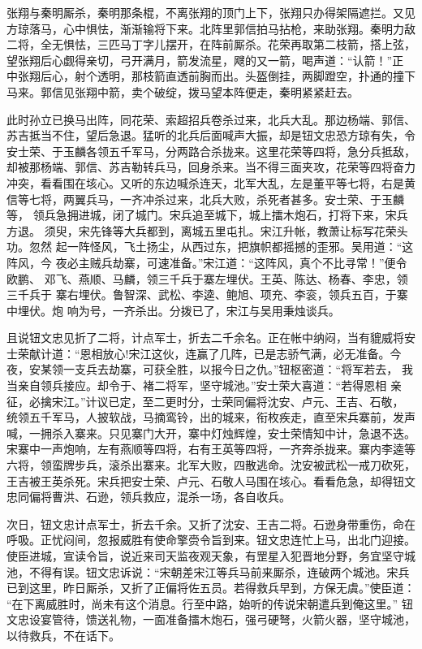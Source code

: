 张翔与秦明厮杀，秦明那条棍，不离张翔的顶门上下，张翔只办得架隔遮拦。又见
方琼落马，心中惧怯，渐渐输将下来。北阵里郭信拍马拈枪，来助张翔。秦明力敌
二将，全无惧怯，三匹马丁字儿摆开，在阵前厮杀。花荣再取第二枝箭，搭上弦，
望张翔后心觑得亲切，弓开满月，箭发流星，飕的又一箭，喝声道：“认箭！”正
中张翔后心，射个透明，那枝箭直透前胸而出。头盔倒挂，两脚蹬空，扑通的撞下
马来。郭信见张翔中箭，卖个破绽，拨马望本阵便走，秦明紧紧赶去。

此时孙立已换马出阵，同花荣、索超招兵卷杀过来，北兵大乱。那边杨端、郭信、
苏吉抵当不住，望后急退。猛听的北兵后面喊声大振，却是钮文忠恐方琼有失，令
安士荣、于玉麟各领五千军马，分两路合杀拢来。这里花荣等四将，急分兵抵敌，
却被那杨端、郭信、苏吉勒转兵马，回身杀来。当不得三面夹攻，花荣等四将奋力
冲突，看看围在垓心。又听的东边喊杀连天，北军大乱，左是董平等七将，右是黄
信等七将，两翼兵马，一齐冲杀过来，北兵大败，杀死者甚多。安士荣、于玉麟等，
领兵急拥进城，闭了城门。宋兵追至城下，城上擂木炮石，打将下来，宋兵方退。
须臾，宋先锋等大兵都到，离城五里屯扎。宋江升帐，教萧让标写花荣头功。忽然
起一阵怪风，飞土扬尘，从西过东，把旗帜都摇撼的歪邪。吴用道：“这阵风，今
夜必主贼兵劫寨，可速准备。”宋江道：“这阵风，真个不比寻常！”便令欧鹏、
邓飞、燕顺、马麟，领三千兵于寨左埋伏。王英、陈达、杨春、李忠，领三千兵于
寨右埋伏。鲁智深、武松、李逵、鲍旭、项充、李衮，领兵五百，于寨中埋伏。炮
响为号，一齐杀出。分拨已了，宋江与吴用秉烛谈兵。

且说钮文忠见折了二将，计点军士，折去二千余名。正在帐中纳闷，当有貔威将安
士荣献计道：“恩相放心!宋江这伙，连赢了几阵，已是志骄气满，必无准备。今
夜，安某领一支兵去劫寨，可获全胜，以报今日之仇。”钮枢密道：“将军若去，
我当亲自领兵接应。却令于、褚二将军，坚守城池。”安士荣大喜道：“若得恩相
亲征，必擒宋江。”计议已定，至二更时分，士荣同偏将沈安、卢元、王吉、石敬，
统领五千军马，人披软战，马摘鸾铃，出的城来，衔枚疾走，直至宋兵寨前，发声
喊，一拥杀入寨来。只见寨门大开，寨中灯烛辉煌，安士荣情知中计，急退不迭。
宋寨中一声炮响，左有燕顺等四将，右有王英等四将，一齐奔杀拢来。寨内李逵等
六将，领蛮牌步兵，滚杀出寨来。北军大败，四散逃命。沈安被武松一戒刀砍死，
王吉被王英杀死。宋兵把安士荣、卢元、石敬人马围在垓心。看看危急，却得钮文
忠同偏将曹洪、石逊，领兵救应，混杀一场，各自收兵。

次日，钮文忠计点军士，折去千余。又折了沈安、王吉二将。石逊身带重伤，命在
呼吸。正忧闷间，忽报威胜有使命擎赍令旨到来。钮文忠连忙上马，出北门迎接。
使臣进城，宣读令旨，说近来司天监夜观天象，有罡星入犯晋地分野，务宜坚守城
池，不得有误。钮文忠诉说：“宋朝差宋江等兵马前来厮杀，连破两个城池。宋兵
已到这里，昨日厮杀，又折了正偏将佐五员。若得救兵早到，方保无虞。”使臣道：
“在下离威胜时，尚未有这个消息。行至中路，始听的传说宋朝遣兵到俺这里。”
钮文忠设宴管待，馈送礼物，一面准备擂木炮石，强弓硬弩，火箭火器，坚守城池，
以待救兵，不在话下。

